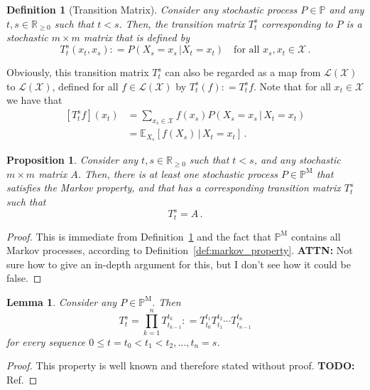 \documentclass[10pt]{paper}
\newtheorem{proposition}[theorem]{Proposition}
\newtheorem{lemma}[theorem]{Lemma}
\newtheorem{definition}{Definition}
\newcommand{\reals}{\mathbb{R}}
\newcommand{\realsnonneg}{\reals_{\geq 0}}
\newcommand{\states}{\mathcal{X}}
\newcommand{\processes}{\mathbb{P}}
\newcommand{\mprocesses}{\processes^{\mathrm{M}}}
\newcommand{\gambles}{\mathcal{L}}
\newcommand{\gamblesX}{\gambles(\states)}
\newcommand{\coloneqq}{:\!=}
\begin{document}
\begin{definition}[Transition Matrix]\label{def:trans_matrix}
Consider any stochastic process $P\in\processes$ and any $t,s\in\realsnonneg$ such that $t<s$. Then, the \emph{transition matrix} $T_t^s$ \emph{corresponding to} $P$ is a stochastic $m\times m$ matrix that is defined by
\begin{equation*}
T_t^s(x_t, x_s) \coloneqq P(X_s=x_s\,\vert X_t=x_t)\quad\text{for all $x_s,x_t\in\states$}\,.
\end{equation*}
\end{definition}
Obviously, this transition matrix $T_t^s$ can also be regarded as a map from $\gamblesX$ to $\gamblesX$, defined for all $f\in\gamblesX$ by $T_t^s(f)\coloneqq T_t^sf$. Note that for all $x_t\in\states$ we have that
\begin{align*}
\left[T_t^sf\right](x_t) &= \sum_{x_s\in\states}f(x_s)P(X_s=x_s\,\vert\,X_t=x_t)\\
 &= \mathbb{E}_{X_s}\left[f(X_s)\,\vert\,X_t=x_t\right]\,.
\end{align*}

\begin{proposition}\label{prop:transitionmatrixhasprocess}
Consider any $t,s\in\realsnonneg$ such that $t<s$, and any stochastic $m\times m$ matrix $A$. Then, there is at least one stochastic process $P\in\mprocesses$ that satisfies the Markov property, and that has a corresponding transition matrix $T_t^s$ such that
\begin{equation*}
T_t^s = A\,.
\end{equation*}
\end{proposition}
\begin{proof}
This is immediate from Definition~\ref{def:trans_matrix} and the fact that $\mprocesses$ contains all Markov processes, according to Definition~\ref{def:markov_property}.\newline
{\bf ATTN:} Not sure how to give an in-depth argument for this, but I don't see how it could be false.
\end{proof}

\begin{lemma}\label{lemma:transitionmatrixfactorises}
Consider any $P\in\mprocesses$. Then
\begin{equation*}
T_t^s=\prod_{k=1}^n T_{t_{k-1}}^{t_k} \coloneqq T_{t_0}^{t_1}T_{t_1}^{t_2}\cdots T_{t_{n-1}}^{t_n}
\end{equation*}
for every sequence $0\leq t=t_0<t_1<t_2,\dots,t_{n}=s$.
\end{lemma}
\begin{proof}
This property is well known and therefore stated without proof. {\bf TODO:} Ref.
\end{proof}
\end{document}
